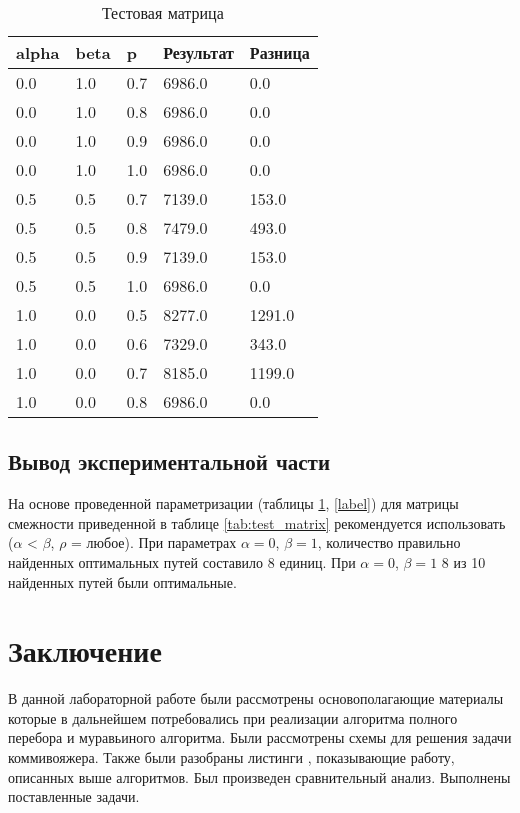 \begin{table}[ht]
    \caption{Тестовая матрица}
    \centering
\begin{tabular}{ l | l  | l |  l  | l}
    alpha&         beta&            p&    Результат&      Разница \\ \hline
    0.0&          1.0&          0.7&       6986.0&          0.0\\
    0.0&          1.0&          0.8&       6986.0&          0.0\\
    0.0&          1.0&          0.9&       6986.0&          0.0\\
    0.0&          1.0&          1.0&       6986.0&          0.0\\
    0.5&          0.5&          0.7&       7139.0&        153.0\\
    0.5&          0.5&          0.8&       7479.0&        493.0\\
    0.5&          0.5&          0.9&       7139.0&        153.0\\
    0.5&          0.5&          1.0&       6986.0&          0.0\\
    1.0&          0.0&          0.5&       8277.0&       1291.0\\
    1.0&          0.0&          0.6&       7329.0&        343.0\\
    1.0&          0.0&          0.7&       8185.0&       1199.0\\
    1.0&          0.0&          0.8&       6986.0&          0.0\\
\end{tabular}
\label{tab:some_res}
\end{table}


\newpage



\section{Вывод экспериментальной части}\label{experimentresult}

На основе проведенной параметризации (таблицы \ref{tab:some_res}, \ref{label}) для матрицы
смежности приведенной в таблице \ref{tab:test_matrix} рекомендуется использовать
($\alpha$ < $\beta$, $\rho$ = любое). При параметрах $\alpha = 0$,  $\beta = 1$, количество правильно
найденных оптимальных путей составило 8 единиц. При $\alpha = 0$, $\beta = 1$ 8 из 10 найденных путей были 
оптимальные.

\chapter*{Заключение}\label{exit}

В данной лабораторной работе были рассмотрены основополагающие
материалы которые в дальнейшем потребовались при реализации алгоритма
полного перебора и муравьиного алгоритма. Были рассмотрены схемы для
решения задачи коммивояжера. Также были разобраны листинги , показывающие работу,
описанных выше алгоритмов. Был произведен сравнительный
анализ. Выполнены поставленные задачи.

